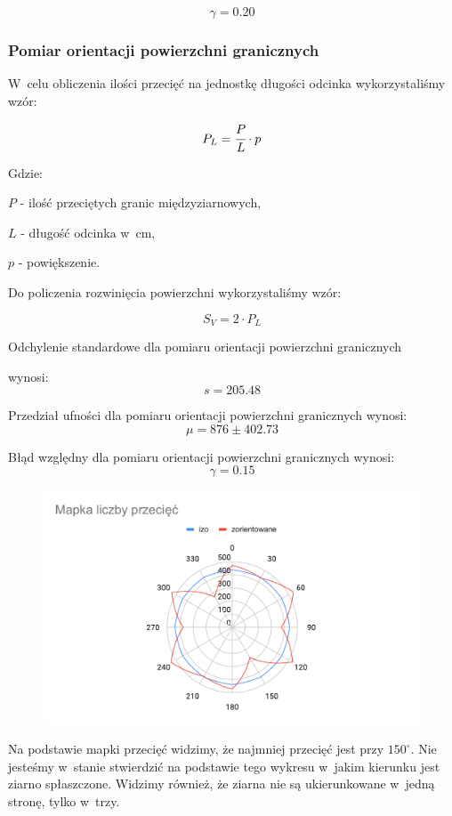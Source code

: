 \documentclass[a4paper,12pt]{article}
\begin{document}
$$\gamma=0.20$$

\subsubsection{Pomiar orientacji powierzchni granicznych}

W~celu obliczenia ilości przecięć na jednostkę długości odcinka wykorzystaliśmy wzór:

$$P_L=\cfrac{P}{L} \cdot p$$

Gdzie:

$P$ - ilość przeciętych granic międzyziarnowych,

$L$ - długość odcinka w~cm,

$p$ - powiększenie.
\newline

Do policzenia rozwinięcia powierzchni wykorzystaliśmy wzór:

$$S_V= 2\cdot P_L$$



Odchylenie standardowe dla pomiaru orientacji powierzchni granicznych 

wynosi:
$$s=205.48$$

Przedział ufności dla pomiaru orientacji powierzchni granicznych wynosi:
$$\mu = 876\pm 402.73$$

Błąd względny dla pomiaru orientacji powierzchni granicznych wynosi:
$$\gamma = 0.15$$
\newline

\begin{figure}[H]
    \centering
    \includegraphics[width=\textwidth]{img/Mapka liczby przecięć.pdf}
\end{figure}

{\color{purple}
Na podstawie mapki przecięć widzimy, że najmniej przecięć jest przy $150^{\circ}$. Nie jesteśmy w~stanie stwierdzić na podstawie tego wykresu w~jakim kierunku jest ziarno spłaszczone. Widzimy również, że ziarna nie są ukierunkowane w~jedną stronę, tylko w~trzy. 
}
\end{document}

